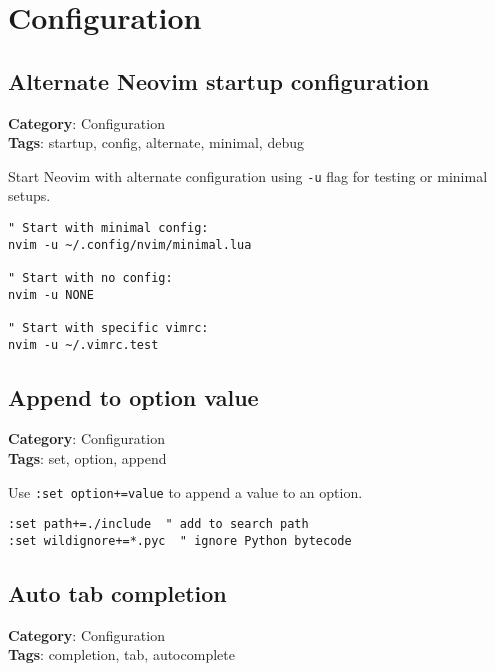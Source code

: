 {{{{\chapter{Configuration}
\section{Alternate Neovim startup configuration}

\textbf{Category}: Configuration\\ \textbf{Tags}: startup, config, alternate, minimal, debug
\vspace{0.5cm}

Start Neovim with alternate configuration using {\footnotesize \Verb§-u§} flag for testing or minimal setups.

\begin{Exa*}{}
\begin{Verbatim}[fontsize=\footnotesize, breaklines, breakanywhere]
" Start with minimal config:
nvim -u ~/.config/nvim/minimal.lua

" Start with no config:
nvim -u NONE

" Start with specific vimrc:
nvim -u ~/.vimrc.test
\end{Verbatim}
\end{Exa*}

\section{Append to option value}

\textbf{Category}: Configuration\\ \textbf{Tags}: set, option, append
\vspace{0.5cm}

Use {\footnotesize \Verb§:set option+=value§} to append a value to an option.

\begin{Exa*}{}
\begin{Verbatim}[fontsize=\footnotesize, breaklines, breakanywhere]
:set path+=./include  " add to search path
:set wildignore+=*.pyc  " ignore Python bytecode
\end{Verbatim}
\end{Exa*}

\section{Auto tab completion}

\textbf{Category}: Configuration\\ \textbf{Tags}: completion, tab, autocomplete
\vspace{0.5cm}

}}}}
